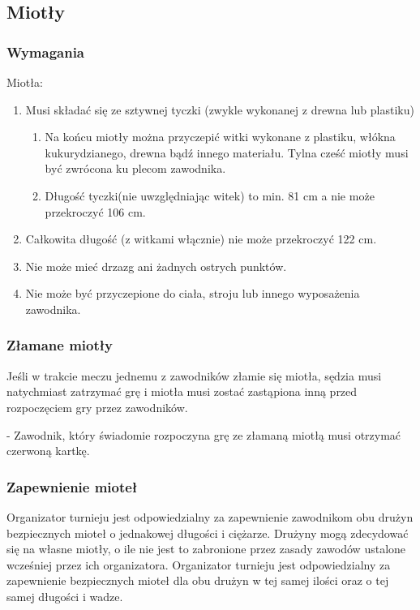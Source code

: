 \documentclass[12pt]{article}
\newcommand\redcard{\bgroup\color{red}\markoverwith{\textcolor{red}{\rule[-0.5ex]{2pt}{0.4pt}}}\ULon}
\begin{document}
\subsection{Miotły}

\subsubsection{Wymagania}
Miotła:

\begin{enumerate}
	\item
	      Musi składać się ze sztywnej tyczki (zwykle wykonanej z drewna lub
	      plastiku)

	      \begin{enumerate}
		      \item
		            Na końcu miotły można przyczepić witki wykonane z plastiku, włókna
		            kukurydzianego, drewna bądź innego materiału. Tylna cześć miotły
		            musi być zwrócona ku plecom zawodnika.
		      \item
		            Długość tyczki(nie uwzględniając witek) to min. 81 cm a nie może
		            przekroczyć 106 cm.
	      \end{enumerate}
	\item
	      Całkowita długość (z witkami włącznie) nie może przekroczyć 122 cm.
	\item
	      Nie może mieć drzazg ani żadnych ostrych punktów.
	\item
	      Nie może być przyczepione do ciała, stroju lub innego wyposażenia
	      zawodnika.
\end{enumerate}

\subsubsection{Złamane miotły}
Jeśli w trakcie meczu jednemu z
zawodników złamie się miotła, sędzia musi natychmiast zatrzymać grę i
miotła musi zostać zastąpiona inną przed rozpoczęciem gry przez
zawodników.

\redcard{Czerwona kartka} - Zawodnik, który świadomie rozpoczyna grę ze
złamaną miotłą musi otrzymać czerwoną kartkę.

\subsubsection{Zapewnienie mioteł}
Organizator turnieju jest odpowiedzialny za zapewnienie zawodnikom obu
drużyn bezpiecznych mioteł o jednakowej długości i ciężarze. Drużyny
mogą zdecydować się na własne miotły, o ile nie jest to zabronione przez
zasady zawodów ustalone wcześniej przez ich organizatora. Organizator
turnieju jest odpowiedzialny za zapewnienie bezpiecznych mioteł dla obu
drużyn w tej samej ilości oraz o tej samej długości i wadze.
\end{document}
